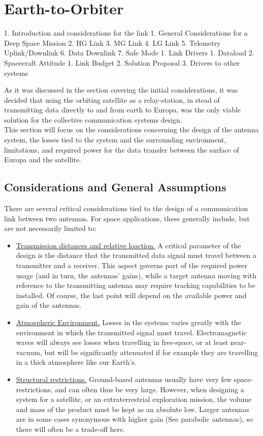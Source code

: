 \section{Earth-to-Orbiter} %

1. Introduction and considerations for the link
   1. General Considerations for a Deep Space Mission
   2. HG Link
   3. MG Link
   4. LG Link
   5. Telemetry Uplink/Downlink
   6. Data Downlink
   7. Safe Mode
1. Link Drivers
   1. Dataload
   2. Spacecraft Attitude
1. Link Budget
2. Solution Proposal
3. Drivers to other systems



As it was discussed in the section covering the initial considerations, it was decided that using the orbiting satellite as a relay-station, in stead of transmitting data directly to and from earth to Europa, was the only viable solution for the collective communication systems design.\\
This section will focus on the considerations concerning the design of the antenna system, the losses tied to the system and the surrounding environment, limitations, and required power for the data transfer between the surface of Europa and the satellite.

\subsection{Considerations and General Assumptions}
There are several critical considerations tied to the design of a communication link between two antennas. For space applications, these generally include, but are not necessarily limited to:

\begin{itemize}
\item \underline{Transmission distances and relative loaction.} A critical parameter of the design is the distance that the transmitted data signal must travel between a transmitter and a receiver. This aspect governs part of the required power usage (and in turn, the antennas' gains), while a target antenna moving with reference to the transmitting antenna may require tracking capabilities to be installed. Of course, the last point will depend on the available power and gain of the antennas.
\item \underline{Atmospheric Environment.} Losses in the systems varies greatly with the environment in which the transmitted signal must travel. Electromagnetic waves will always see losses when travelling in free-space, or at least near-vacuum, but will be significantly attenuated if for example they are travelling in a thick atmosphere like our Earth's.
\item \underline{Structural restrictions.} Ground-based antennas usually have very few space-restrictions, and can often thus be very large. However, when designing a system for a satellite, or an extraterrestrial exploration mission, the volume and mass of the product must be kept as an absolute low. Larger antennas are in some cases synonymous with higher gain (See parabolic antennas), so there will often be a trade-off here.
\end{itemize}

